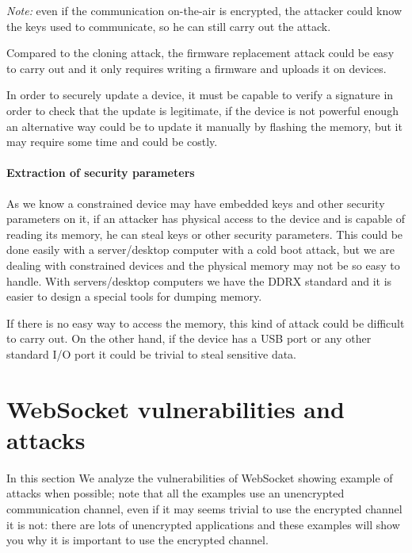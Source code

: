 	\emph{Note:} even if the communication on-the-air is encrypted, the attacker could know the keys used to communicate, so he can still carry out the attack.\newline
	
	Compared to the cloning attack, the firmware replacement attack could be easy to carry out and it only requires writing a firmware and uploads it on devices.\newline
	
	In order to securely update a device, it must be capable to verify a signature in order to check that the update is legitimate, if the device is not powerful enough an alternative way could be to update it manually by flashing the memory, but it may require some time and could be costly.\newline
	
	\paragraph{Extraction of security parameters}
	As we know a constrained device may have embedded keys and other security parameters on it, if an attacker has physical access to the device and is capable of reading its memory, he can steal keys or other security parameters.\newline
	This could be done easily with a server/desktop computer with a cold boot attack, but we are dealing with constrained devices and the physical memory may not be so easy to handle. With servers/desktop computers we have the DDRX standard and it is easier to design a special tools for dumping memory.\newline
	
	If there is no easy way to access the memory, this kind of attack could be difficult to carry out.
	On the other hand, if the device has a USB port or any other standard I/O port it could be trivial to steal sensitive data.
	
	
	\section{WebSocket vulnerabilities and attacks}
	In this section We analyze the vulnerabilities of WebSocket showing example of attacks when possible; note that
	all the examples use an unencrypted communication channel, even if it may seems trivial to use the encrypted channel
	it is not: there are lots of unencrypted applications and these examples will show you why it is important to use
	the encrypted channel.\\
	
